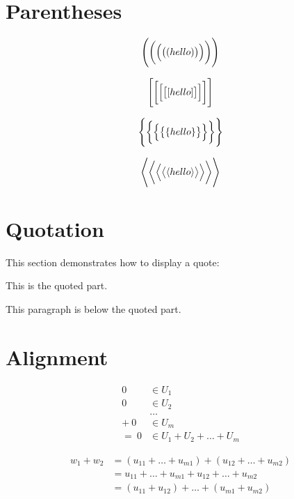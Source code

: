 \documentclass[12pt, letterpaper, oneside]{article}
\begin{document}
\section{Parentheses}

\[\Biggl(\biggl(\Bigl(\bigl((hello)\bigr)\Bigr)\biggr)\Biggr)\]

\[\Biggl[\biggl[\Bigl[\bigl[[hello]\bigr]\Bigr]\biggr]\Biggr]\]

\[\Biggl\{\biggl\{\Bigl\{\bigl\{\{hello\}\bigr\}\Bigr\}\biggr\}\Biggr\}\]

\[
  \Biggl \langle \biggl \langle \Bigl \langle \bigl \langle
  \langle
  hello
  \rangle
  \bigr \rangle \Bigr \rangle \biggr \rangle \Biggr \rangle
\]

\section{Quotation}

This section demonstrates how to display a quote:

\begin{displayquote}
  This is the quoted part.
\end{displayquote}

This paragraph is below the quoted part.

\section{Alignment}

\begin{align*}
  0     & \in U_1                      \\
  0     & \in U_2                      \\
        & \ldots                       \\
  + \ 0 & \in U_m                      \\
  = \ 0 & \in U_1 + U_2 + \ldots + U_m
\end{align*}

\begin{align*}
  w_1 + w_2 & = (u_{11} + \ldots + u_{m1}) + (u_{12} + \ldots + u_{m2}) \\
            & = u_{11} + \ldots + u_{m1} + u_{12} + \ldots + u_{m2}     \\
            & = (u_{11} + u_{12}) + \ldots + (u_{m1} + u_{m2})
\end{align*}
\end{document}
